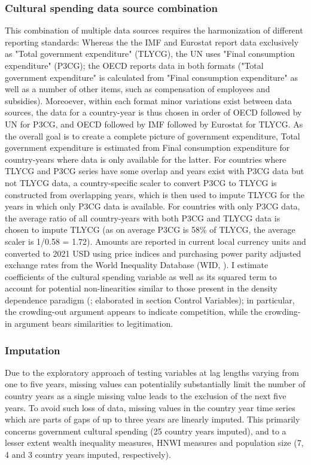 \documentclass[11pt]{article}
\begin{document}
\subsubsection{Cultural spending data source combination}


This combination of multiple data sources requires the harmonization of different reporting standards: 
Whereas the the IMF and Eurostat report data exclusively as "Total government expenditure" (TLYCG), the UN uses "Final consumption expenditure" (P3CG); the OECD reports data in both formats ("Total government expenditure" is calculated from "Final consumption expenditure" as well as a number of other items, such as compensation of employees and subsidies). 
Moreoever, within each format minor variations exist between data sources, the data for a country-year is thus chosen in order of OECD followed by UN for P3CG, and OECD followed by IMF followed by Eurostat for TLYCG.
As the overall goal is to create a complete picture of government expenditure, Total government expenditure is estimated from Final consumption expenditure for country-years where data is only available for the latter.
For countries where TLYCG and P3CG series have some overlap and years exist with P3CG data but not TLYCG data, a country-specific scaler to convert P3CG to TLYCG is constructed from overlapping years, which is then used to impute TLYCG for the years in which only P3CG data is available.
For countries with only P3CG data, the average ratio of all country-years with both P3CG and TLYCG data is chosen to impute TLYCG (as on average P3CG is 58\% of TLYCG, the average scaler is 1/0.58 = 1.72). 
Amounts are reported in current local currency units and converted to 2021 USD using price indices and purchasing power parity adjusted exchange rates from the World Inequality Database (WID,  \citeyear{WID_2021_WID}).
I estimate coefficients of the cultural spending variable as well as its squared term to account for potential non-linearities similar to those present in the density dependence paradigm (\cite{Hannan_1992_dynamics};  elaborated in section Control Variables); in particular, the crowding-out argument appears to indicate competition, while the crowding-in argument bears similarities to legitimation. 


\subsubsection{Imputation}


Due to the exploratory approach of testing variables at lag lengths varying from one to five years, missing values can potentialily substantially limit the number of country years as a single missing value leads to the exclusion of the next five years.
To avoid such loss of data, missing values in the country year time series which are parts of gaps of up to three years are linearly imputed.
This primarily concerns government cultural spending (25 country years imputed), and to a lesser extent wealth inequality measures, HNWI measures and population size (7, 4 and 3 country years imputed, respectively).
\end{document}
